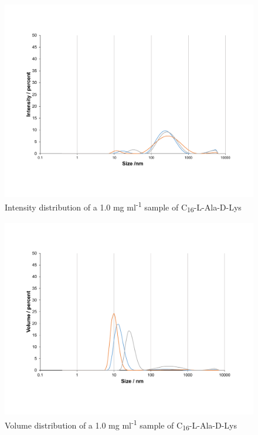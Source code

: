 \begin{figure} [ht!]
\centering
\includegraphics[scale=0.47]{DLS/KAT1_30_1_0mg_ml-1_size.pdf}
\caption{Intensity distribution of a 1.0 mg ml\textsuperscript{-1} sample of C\textsubscript{16}-L-Ala-D-Lys}
\label{size_distribution_KAT1.30_1.0}
\end{figure}
\begin{figure} [ht!]
\centering
\includegraphics[scale=0.47]{DLS/KAT1_30_1_0mg_ml-1_volume.pdf}
\caption{Volume distribution of a 1.0 mg ml\textsuperscript{-1} sample of C\textsubscript{16}-L-Ala-D-Lys}
\label{volume_distribution_KAT1.30_1.0}
\end{figure}

